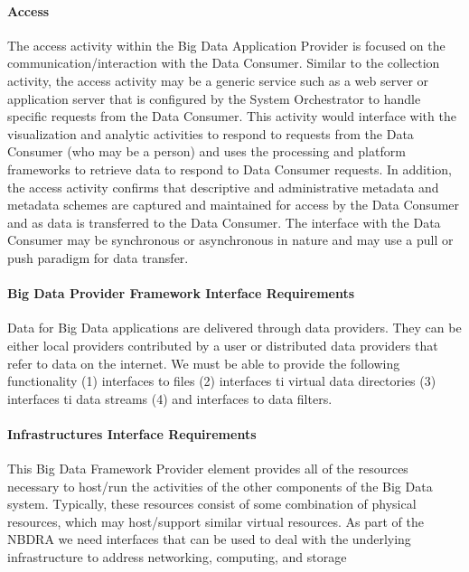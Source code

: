 \documentclass[10pt]{article}
\begin{document}
\paragraph{Access}

The access activity within the Big Data Application Provider is
focused on the communication/interaction with the Data Consumer.
Similar to the collection activity, the access activity may be a
generic service such as a web server or application server that is
configured by the System Orchestrator to handle specific requests from
the Data Consumer. This activity would interface with the
visualization and analytic activities to respond to requests from the
Data Consumer (who may be a person) and uses the processing and
platform frameworks to retrieve data to respond to Data Consumer
requests. In addition, the access activity confirms that descriptive
and administrative metadata and metadata schemes are captured and
maintained for access by the Data Consumer and as data is transferred
to the Data Consumer. The interface with the Data Consumer may be
synchronous or asynchronous in nature and may use a pull or push
paradigm for data transfer.

\paragraph{Big Data Provider Framework Interface Requirements}

Data for Big Data applications are delivered through data providers.
They can be either local providers contributed by a user or
distributed data providers that refer to data on the internet. We must
be able to provide the following functionality (1) interfaces to files
(2) interfaces ti virtual data directories (3) interfaces ti data
streams (4) and interfaces to data filters.

\paragraph{Infrastructures Interface Requirements}

This Big Data Framework Provider element provides all of the resources
necessary to host/run the activities of the other components of the
Big Data system. Typically, these resources consist of some
combination of physical resources, which may host/support similar
virtual resources. As part of the NBDRA we need interfaces that can be
used to deal with the underlying infrastructure to address networking,
computing, and storage
\end{document}
